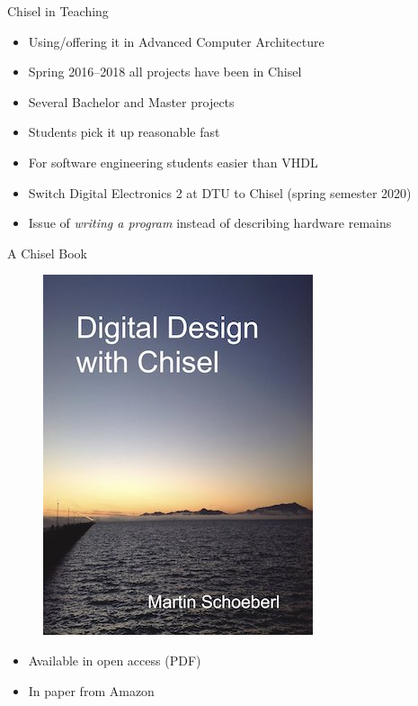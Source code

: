 \begin{frame}[fragile]{Chisel in Teaching}
\begin{itemize}
\item Using/offering it in Advanced Computer Architecture
\item Spring 2016--2018 all projects have been in Chisel
\item Several Bachelor and Master projects
\item Students pick it up reasonable fast
\item For software engineering students easier than VHDL
\item Switch Digital Electronics 2 at DTU to Chisel (spring semester 2020)
\item Issue of \emph{writing a program} instead of describing hardware remains
\end{itemize}
\end{frame}


\begin{frame}[fragile]{A Chisel Book}
\begin{figure}
    \centering
    \includegraphics[scale=0.4]{../cover-small}
\end{figure}

\begin{itemize}
\item Available in open access (PDF)
\item In paper from Amazon
\end{itemize}
\end{frame}


